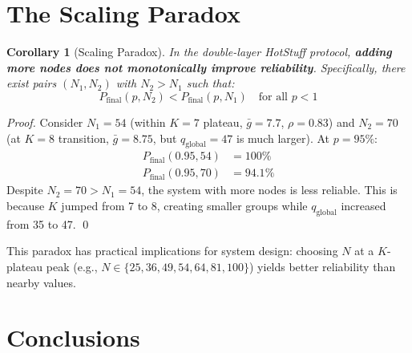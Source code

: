 \documentclass[12pt,a4paper]{article}
\newtheorem{corollary}{Corollary}
\begin{document}
\section{The Scaling Paradox}
\label{sec:paradox}

\begin{corollary}[Scaling Paradox]
In the double-layer HotStuff protocol, \textbf{adding more nodes does not monotonically improve reliability}. Specifically, there exist pairs $(N_1, N_2)$ with $N_2 > N_1$ such that:
\[
  P_{\text{final}}(p, N_2) < P_{\text{final}}(p, N_1) \quad \text{for all } p < 1
\]
\end{corollary}

\begin{proof}
Consider $N_1 = 54$ (within $K = 7$ plateau, $\bar{g} = 7.7$, $\rho = 0.83$) and $N_2 = 70$ (at $K = 8$ transition, $\bar{g} = 8.75$, but $q_{\text{global}} = 47$ is much larger). At $p = 95\%$:
\begin{align*}
  P_{\text{final}}(0.95, 54) &= 100\% \\
  P_{\text{final}}(0.95, 70) &= 94.1\%
\end{align*}
Despite $N_2 = 70 > N_1 = 54$, the system with more nodes is less reliable. This is because $K$ jumped from 7 to 8, creating smaller groups while $q_{\text{global}}$ increased from 35 to 47. \qed
\end{proof}

This paradox has practical implications for system design: choosing $N$ at a $K$-plateau peak (e.g., $N \in \{25, 36, 49, 54, 64, 81, 100\}$) yields better reliability than nearby values.

\section{Conclusions}
\label{sec:conclusions}
\end{document}
